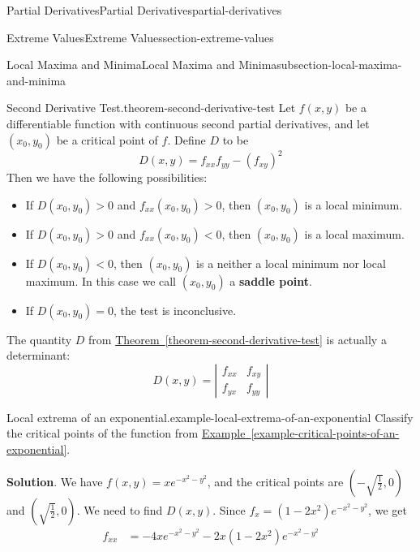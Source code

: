 \documentclass[oneside,10pt,]{book}
\newcommand{\terminology}[1]{\textbf{#1}}
\numberwithin{equation}{section}
\begin{document}
\begin{chapterptx}{Partial Derivatives}{}{Partial Derivatives}{}{}{partial-derivatives}
\begin{sectionptx}{Extreme Values}{}{Extreme Values}{}{}{section-extreme-values}
\begin{subsectionptx}{Local Maxima and Minima}{}{Local Maxima and Minima}{}{}{subsection-local-maxima-and-minima}
\begin{theorem}{Second Derivative Test.}{}{theorem-second-derivative-test}%
\hypertarget{p-1428}{}%
Let \(f(x,y)\) be a differentiable function with continuous second partial derivatives, and let \((x_{0},y_{0})\) be a critical point of \(f\). Define \(D\) to be%
\begin{equation*}
D(x,y) = f_{xx}f_{yy} - (f_{xy})^{2}
\end{equation*}
Then we have the following possibilities:\leavevmode%
\begin{itemize}[label=\textbullet]
\item{}If \(D(x_{0},y_{0}) > 0 \) and \(f_{xx}(x_{0},y_{0}) > 0\), then \((x_{0},y_{0})\) is a local minimum.%
\item{}If \(D(x_{0},y_{0}) > 0 \) and \(f_{xx}(x_{0},y_{0}) < 0\), then \((x_{0},y_{0})\) is a local maximum.%
\item{}If \(D(x_{0},y_{0}) < 0 \), then \((x_{0},y_{0})\) is a neither a local minimum nor local maximum. In this case we call \((x_{0},y_{0})\) a \terminology{saddle point}.%
\item{}If \(D(x_{0},y_{0}) = 0 \), the test is inconclusive.%
\end{itemize}
%
\end{theorem}
\hypertarget{p-1429}{}%
The quantity \(D\) from \hyperref[theorem-second-derivative-test]{Theorem~\ref{theorem-second-derivative-test}} is actually a determinant:%
\begin{equation*}
D(x,y) = \left|\begin{array}{cc} f_{xx} & f_{xy} \\ f_{yx} & f_{yy}\end{array}\right|
\end{equation*}
%
\begin{example}{Local extrema of an exponential.}{example-local-extrema-of-an-exponential}%
\hypertarget{p-1430}{}%
Classify the critical points of the function from \hyperref[example-critical-points-of-an-exponential]{Example~\ref{example-critical-points-of-an-exponential}}.%
\par\smallskip%
\noindent\textbf{Solution}.\hypertarget{solution-232}{}\quad%
\hypertarget{p-1431}{}%
We have \(f(x,y) = xe^{-x^{2} - y^{2}}\), and the critical points are \((-\sqrt{\frac{1}{2}},0)\) and \((\sqrt{\frac{1}{2}},0)\). We need to find \(D(x,y)\). Since \(f_{x} = (1 - 2x^{2})e^{-x^{2} - y^{2}}\), we get%
\begin{align*}
f_{xx} & = -4xe^{-x^{2} - y^{2}} - 2x(1 - 2x^{2})e^{-x^{2} - y^{2}} \\

\end{align*}
\end{example}
\end{subsectionptx}
\end{sectionptx}
\end{chapterptx}
\end{document}
